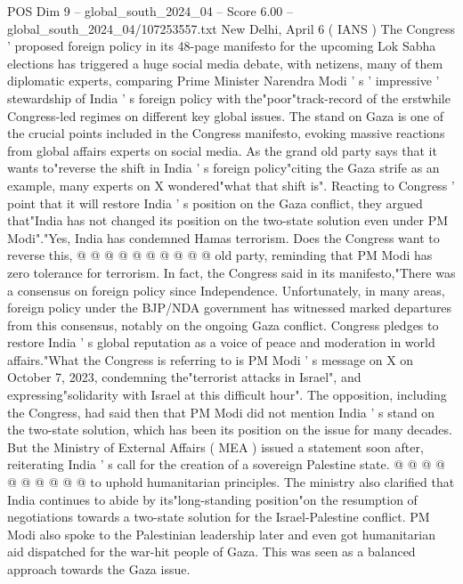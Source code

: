 \begin{textsample}{POS Dim 9 – global\_south\_2024\_04 – Score 6.00 – global\_south\_2024\_04/107253557.txt}  \label{ex:f9_pos_071}
New Delhi, April 6 ( IANS ) The Congress ' proposed foreign policy in its 48-page manifesto for the upcoming Lok Sabha elections has triggered a huge social media debate, with netizens, many of them diplomatic experts, comparing Prime Minister Narendra Modi ' s ' impressive ' stewardship of India ' s foreign policy with the"poor"track-record of the erstwhile Congress-led regimes on different key global issues.
The stand on Gaza is one of the crucial points included in the Congress manifesto, evoking massive reactions from global affairs experts on social media.
As the grand old party says that it wants to"reverse the shift in India ' s foreign policy"citing the Gaza strife as an example, many experts on X wondered"what that shift is".
Reacting to Congress ' point that it will restore India ' s position on the Gaza conflict, they argued that"India has not changed its position on the two-state solution even under PM Modi"."Yes, India has condemned Hamas terrorism.
Does the Congress want to reverse this, @ @ @ @ @ @ @ @ @ @ old party, reminding that PM Modi has zero tolerance for terrorism.
In fact, the Congress said in its manifesto,"There was a consensus on foreign policy since Independence.
Unfortunately, in many areas, foreign policy under the BJP/NDA government has witnessed marked departures from this consensus, notably on the ongoing Gaza conflict.
Congress pledges to restore India ' s global reputation as a voice of peace and moderation in world affairs."What the Congress is referring to is PM Modi ' s message on X on October 7, 2023, condemning the"terrorist attacks in Israel", and expressing"solidarity with Israel at this difficult hour".
The opposition, including the Congress, had said then that PM Modi did not mention India ' s stand on the two-state solution, which has been its position on the issue for many decades.
But the Ministry of External Affairs ( MEA ) issued a statement soon after, reiterating India ' s call for the creation of a sovereign Palestine state. @ @ @ @ @ @ @ @ @ @ to uphold humanitarian principles.
The ministry also clarified that India continues to abide by its"long-standing position"on the resumption of negotiations towards a two-state solution for the Israel-Palestine conflict.
PM Modi also spoke to the Palestinian leadership later and even got humanitarian aid dispatched for the war-hit people of Gaza.
This was seen as a balanced approach towards the Gaza issue.

\end{textsample}
